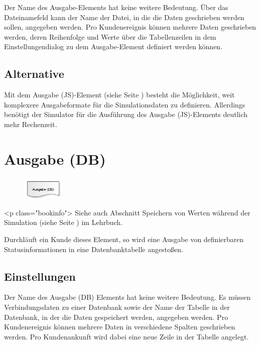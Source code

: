 Der Name des Ausgabe-Elements hat keine weitere Bedeutung. Über das Dateinamefeld kann der Name der Datei,
in die die Daten geschrieben werden sollen, angegeben werden. Pro Kundenereignis können mehrere Daten
geschrieben werden, deren Reihenfolge und Werte über die Tabellenzeilen in dem Einstellungendialog zu
dem Ausgabe-Element definiert werden können.

\subsection*{Alternative}

Mit dem Ausgabe (JS)-Element (siehe Seite \pageref{ref:ModelElementOutputJS}) besteht die Möglichkeit, weit komplexere
Ausgabeformate für die Simulationsdaten zu definieren. Allerdings benötigt der Simulator für die Ausführung
des Ausgabe (JS)-Elements deutlich mehr Rechenzeit.


\section{Ausgabe (DB)}
\label{ref:ModelElementOutputDB}

\begin{figure}
\vspace{-22pt}
\includegraphics[width=2cm]{imageModelElementOutputDB.png}
\vspace{-22pt}
\end{figure}

<p class="bookinfo">
Siehe auch Abschnitt Speichern von Werten während der Simulation (siehe Seite \pageref{ref:book:9.3.3}) im Lehrbuch.

Durchläuft ein Kunde dieses Element, so wird eine Ausgabe von definierbaren Statusinformationen in eine
Datenbanktabelle angestoßen.

\subsection*{Einstellungen}

Der Name des Ausgabe (DB) Elements hat keine weitere Bedeutung. Es müssen Verbindungsdaten zu einer
Datenbank sowie der Name der Tabelle in der Datenbank, in der die Daten gespeichert werden, angegeben werden.
Pro Kundenereignis können mehrere Daten in verschiedene Spalten geschrieben werden. Pro Kundenankunft
wird dabei eine neue Zeile in der Tabelle angelegt.


